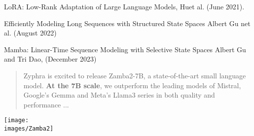 {

LoRA: Low-Rank Adaptation of Large Language Models, Huet al. (June 2021).

\vfill
Efficiently Modeling Long Sequences with Structured State Spaces
Albert Gu net al. (August 2022)

\vfill

Mamba: Linear-Time Sequence Modeling with Selective State Spaces
Albert Gu and Tri Dao, (December 2023)


\begin{quotation}
Zyphra is excited to release Zamba2-7B, a state-of-the-art small language model. {\bf At the 7B scale}, we outperform the leading models of Mistral, Google’s Gemma and Meta’s Llama3 series in both quality and performance ...
\end{quotation}


\centerline{\texttt{[image: \\images/Zamba2]}}

}

